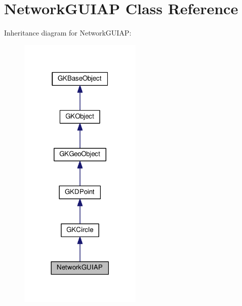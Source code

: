 \hypertarget{classNetworkGUIAP}{}\section{Network\+G\+U\+I\+AP Class Reference}
\label{classNetworkGUIAP}


Inheritance diagram for Network\+G\+U\+I\+AP\+:
\nopagebreak
\begin{figure}[H]
\begin{center}
\leavevmode
\includegraphics[width=165pt]{classNetworkGUIAP__inherit__graph}
\end{center}
\end{figure}


